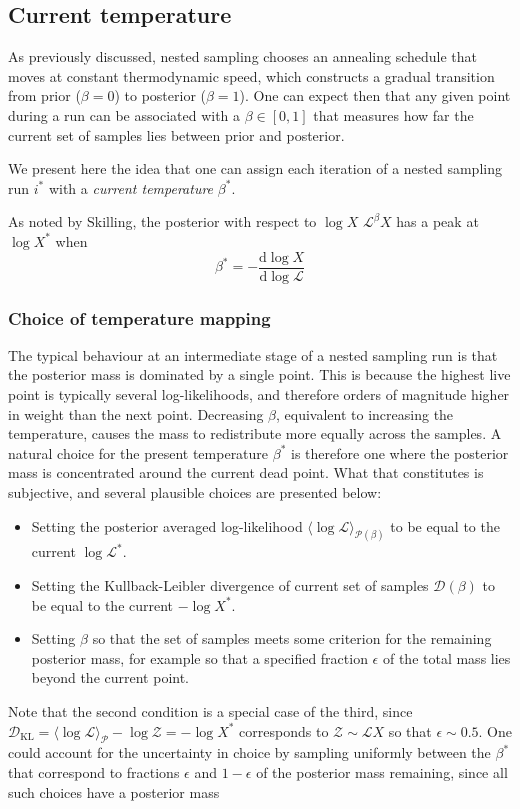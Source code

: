 \documentclass[usenatbib]{mnras}
\newcommand{\Like}{\mathcal{L}}
\newcommand{\DKL}{\mathcal{D}_\mathrm{KL}}
\begin{document}
\subsection{Current temperature}\label{sec:current_temperature}
As previously discussed, nested sampling chooses an annealing schedule that moves at constant thermodynamic speed, which constructs a gradual transition from prior ($\beta = 0$) to posterior ($\beta = 1$). One can expect then that any given point during a run can be associated with a $\beta \in [0,1]$ that measures how far the current set of samples lies between prior and posterior. 
\par
We present here the idea that one can assign each iteration of a nested sampling run $i^{*}$ with a \textit{current temperature} $\beta^*$.
\par
As noted by Skilling, the posterior with respect to $\log X$ $\Like^{\beta} X$ has a peak at $\log X^*$ when  
\begin{equation}
    \beta^* = - \frac{\mathrm{d} \log X}{\mathrm{d} \log \Like}
\end{equation}



\subsubsection*{Choice of temperature mapping}
The typical behaviour at an intermediate stage of a nested sampling run is that the posterior mass is dominated by a single point. This is because the highest live point is typically several log-likelihoods, and therefore orders of magnitude higher in weight than the next point. Decreasing $\beta$, equivalent to increasing the temperature, causes the mass to redistribute more equally across the samples. A natural choice for the present temperature $\beta^{*}$ is therefore one where the posterior mass is concentrated around the current dead point. What that constitutes is subjective, and several plausible choices are presented below:
\begin{itemize}
    \item Setting the posterior averaged log-likelihood $\langle \log\Like \rangle_{\mathcal{P}(\beta)}$ to be equal to the current $\log\Like^{*}$.
    \item Setting the Kullback-Leibler divergence of current set of samples $\mathcal{D}(\beta)$ to be equal to the current $-\log X^{*}$.
    \item Setting $\beta$ so that the set of samples meets some criterion for the remaining posterior mass, for example so that a specified fraction $\epsilon$ of the total mass lies beyond the current point.
\end{itemize}
Note that the second condition is a special case of the third, since $\DKL = \langle \log\Like \rangle_\mathcal{P} - \log \mathcal{Z} = -\log X^{*}$ corresponds to $\mathcal{Z} \sim \mathcal{L}X$ so that $\epsilon \sim 0.5$. One could account for the uncertainty in choice by sampling uniformly between the $\beta^{*}$ that correspond to fractions $\epsilon$ and $1 - \epsilon$ of the posterior mass remaining, since all such choices have a posterior mass 
\par
\end{document}
